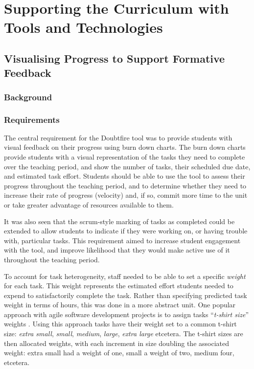
\chapter{Supporting the Curriculum with Tools and Technologies} %
\label{cha:supporting}

\graphicspath{{Figures/Supporting/}}

\section{Visualising Progress to Support Formative Feedback} %
\label{sec:doubtfire}

\subsection{Background} %
\label{sub:doubtfire_background}


\subsection{Requirements} %
\label{sub:doubtfire_requirements}

The central requirement for the Doubtfire tool was to provide students with visual feedback on their progress using burn down charts. The burn down charts provide students with a visual representation of the tasks they need to complete over the teaching period, and show the number of tasks, their scheduled due date, and estimated task effort. Students should be able to use the tool to assess their progress throughout the teaching period, and to determine whether they need to increase their rate of progress (velocity) and, if so, commit more time to the unit or take greater advantage of resources available to them. 

It was also seen that the scrum-style marking of tasks as completed could be extended to allow students to indicate if they were working on, or having trouble with, particular tasks. This requirement aimed to increase student engagement with the tool, and improve likelihood that they would make active use of it throughout the teaching period.

To account for task heterogeneity, staff needed to be able to set a specific \emph{weight} for each task. This weight represents the estimated effort students needed to expend to satisfactorily complete the task. Rather than specifying predicted task weight in terms of hours, this was done in a more abstract unit. One popular approach with agile software development projects is to assign tasks ``\emph{t-shirt size}'' weights \cite{Peixoto:2010}. Using this approach tasks have their weight set to a common t-shirt size: \emph{extra small}, \emph{small}, \emph{medium}, \emph{large}, \emph{extra large} etcetera. The t-shirt sizes are then allocated weights, with each increment in size doubling the associated weight: extra small had a weight of one, small a weight of two, medium four, etcetera.  


